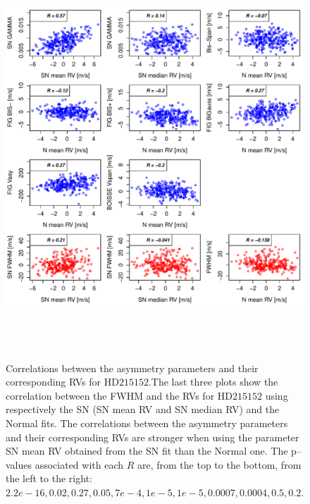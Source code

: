 \documentclass{aa}
\begin{document}
\begin{figure}[htbp]
\begin{center}
\includegraphics[height = 6in]{HD21515_[4]Comparison_para.pdf}  
   \caption{Correlations between the asymmetry parameters and their corresponding RVs for $\text{HD}215152$.The last three plots show the correlation between the FWHM and the RVs for $\text{HD}215152$ using respectively the SN (SN mean RV and SN median RV) and the Normal fits. The correlations between the asymmetry parameters and their corresponding RVs are stronger when using the parameter SN mean RV obtained from the SN fit than the Normal one. The p--values associated with each $R$ are, from the top to the bottom, from the left to the right: $2.2e-16,0.02,0.27, 0.05 ,7e-4,1e-5,1e-5,0.0007,0.0004,0.5,0.2$.}
   \label{fig:HD215152:corrPlot}
\end{center}
\end{figure}
\end{document}

